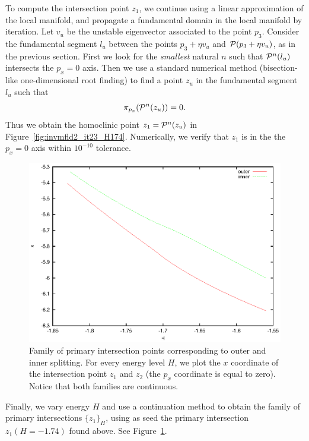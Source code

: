 To compute the intersection point $z_1$, we continue using a linear
approximation of the local manifold, and propagate a fundamental
domain in the local manifold by iteration.
Let $v_u$ be the unstable eigenvector associated to the point $p_3$.
Consider the fundamental segment $l_u$ between the points $p_3+\eta
v_u$ and $\mathcal{P}(p_3+\eta v_u)$, as in the previous section.
First we look for the \emph{smallest} natural $n$ such that
$\mathcal{P}^n(l_u)$ intersects the $p_x=0$ axis.
Then we use a standard numerical method (bisection-like
one-dimensional root finding) to find a point $z_u$ in the fundamental
segment $l_u$ such that
\[ \pi_{p_x}(\mathcal{P}^{n}(z_u))=0. \]
Thus we obtain the homoclinic point $z_1 = \mathcal{P}^{n}(z_u)$ in
Figure~\ref{fig:invmfld2_it23_H174}.
Numerically, we verify that $z_1$ is in the the $p_x=0$ axis within
$10^{-10}$ tolerance.

\begin{figure}
\includegraphics{figs/intersec}
\caption{Family of primary intersection points corresponding to outer
and inner splitting. 
For every energy level $H$, we plot the $x$ coordinate of the
intersection point $z_1$ and $z_2$ (the $p_x$ coordinate is equal to
zero). Notice that both families are continuous.}
\label{fig:intersec}
\end{figure}

Finally, we vary energy $H$ and use a continuation method to obtain
the family of primary intersections $\{z_1\}_H$, using as seed the
primary intersection $z_1(H=-1.74)$ found above.
See Figure~\ref{fig:intersec}.

